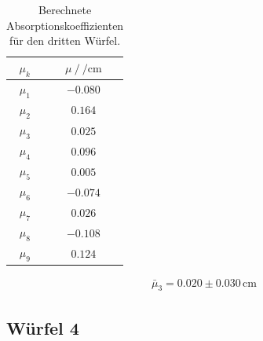 \begin{table}[H]
  \centering
  \begin{tabular}{c c}
    \toprule
     $\mu_k$ &  $\mu \:/\: \si{\per\centi\metre}$ \\
    \midrule
            $\mu_{  1}$ &   $-0.080$ \\
            $\mu_{  2}$ &   $ 0.164$ \\
            $\mu_{  3}$ &   $ 0.025$ \\
            $\mu_{  4}$ &   $ 0.096$ \\
            $\mu_{  5}$ &   $ 0.005$ \\
            $\mu_{  6}$ &   $-0.074$ \\
             $\mu_{ 7}$ &   $ 0.026$ \\
             $\mu_{ 8}$ &   $-0.108$ \\
             $\mu_{ 9}$ &   $ 0.124$ \\
    \bottomrule
    \end{tabular}
  \caption{Berechnete Absorptionskoeffizienten für den dritten Würfel. }
  \label{tab:w3_mu}
\end{table}


\begin{align}
  \bar{\mu}_3 = 0.020\pm0.030 \,\si{\centi\metre}
\end{align}

\subsection{Würfel 4}


